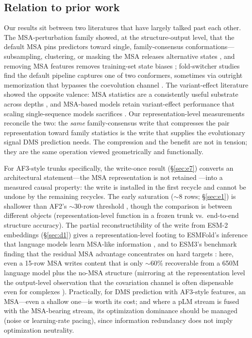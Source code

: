\documentclass[11pt]{article}
\begin{document}
\subsection{Relation to prior work}

Our results sit between two literatures that have largely talked past each
other. The MSA-perturbation family showed, at the structure-output level, that
the default MSA pins predictors toward single, family-consensus
conformations---subsampling, clustering, or masking the MSA releases
alternative states \cite{delalamo2022,waymentsteele2024,stein2022,kalakoti2025},
and removing MSA features removes training-set state biases
\cite{heo2022,sala2023,saldano2022}; fold-switcher studies find the default
pipeline captures one of two conformers, sometimes via outright memorization
that bypasses the coevolution channel \cite{chakravarty2022,chakravarty2024}. The variant-effect literature showed the
opposite valence: MSA statistics are a consistently useful substrate across
depths \cite{notin2023}, and MSA-based models retain variant-effect
performance that scaling single-sequence models sacrifices
\cite{akiyama2025,notin2022}. Our representation-level measurements reconcile
the two: the \emph{same} family-consensus write that compresses the pair
representation toward family statistics is the write that supplies the
evolutionary signal DMS prediction needs. The compression and the benefit are
not in tension; they are the same operation viewed geometrically and
functionally.

For AF3-style trunks specifically, the write-once result
(\S\ref{sec:e7}) converts an architectural statement---the MSA representation
is not retained \cite{abramson2024}---into a measured causal property: the
write is installed in the first recycle and cannot be undone by the remaining
recycles. The early saturation ($\sim$8 rows; \S\ref{sec:e1}) is shallower
than AF2's $\sim$30-row threshold \cite{jumper2021}, though the comparison is
between different objects (representation-level function in a frozen trunk
vs.\ end-to-end structure accuracy). The partial reconstructibility of the
write from ESM-2 embeddings (\S\ref{sec:d1}) gives a representation-level
footing to ESMFold's inference that language models learn MSA-like information
\cite{lin2022}, and to ESM3's benchmark finding that the residual MSA
advantage concentrates on hard targets \cite{hayes2024}: here, even a
15-row MSA writes content that is only $\sim$60\% recoverable from a 650M
language model plus the no-MSA structure (mirroring at the representation level
the output-level observation that the covariation channel is often dispensable
even for complexes \cite{mirdita2022}). Practically, for DMS prediction with
AF3-style features, an MSA---even a shallow one---is worth its cost; and where
a pLM stream is fused with the MSA-bearing stream, its optimization dominance
should be managed (noise or learning-rate pacing), since information
redundancy does not imply optimization neutrality.
\end{document}
